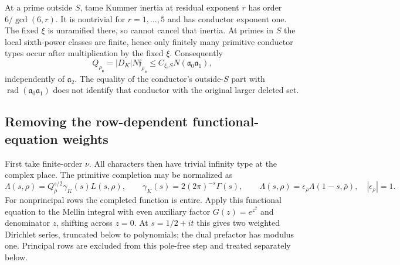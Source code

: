 At a prime outside $S$, tame Kummer inertia at residual exponent $r$
has order $6/\gcd(6,r)$. It is nontrivial for $r=1,\ldots,5$ and
has conductor exponent one. The fixed $\xi$ is unramified there, so
cannot cancel that inertia. At primes in $S$ the local sixth-power
classes are finite, hence only finitely many primitive conductor types
occur after multiplication by the fixed $\xi$. Consequently
\begin{equation}\label{mm:conductor}
 Q_{\rho_{\mathfrak a}}=|D_K|N\mathfrak f_{\rho_{\mathfrak a}}
 \le C_{\xi,S}N(\mathfrak a_0\mathfrak a_1),
\end{equation}
independently of $\mathfrak a_2$. The equality of the conductor's
outside-$S$ part with $\operatorname{rad}(\mathfrak a_0\mathfrak a_1)$
does not identify that conductor with the original larger deleted set.

\subsection{Removing the row-dependent functional-equation weights}
First take finite-order $\nu$. All characters then have trivial infinity
type at the complex place. The primitive completion may be normalized as
\[
 \Lambda(s,\rho)=Q_\rho^{s/2}\gamma_K(s)L(s,\rho),\qquad
 \gamma_K(s)=2(2\pi)^{-s}\Gamma(s),\qquad
 \Lambda(s,\rho)=\epsilon_\rho\Lambda(1-s,\bar\rho),
 \quad |\epsilon_\rho|=1.
\]
For nonprincipal rows the completed function is entire. Apply this
functional equation to the Mellin integral with even auxiliary factor
$G(z)=e^{z^2}$ and denominator $z$, shifting across $z=0$. At
$s=1/2+it$ this gives two weighted Dirichlet series, truncated below to
polynomials; the dual prefactor has modulus one. Principal rows are excluded from
this pole-free step and treated separately below.

